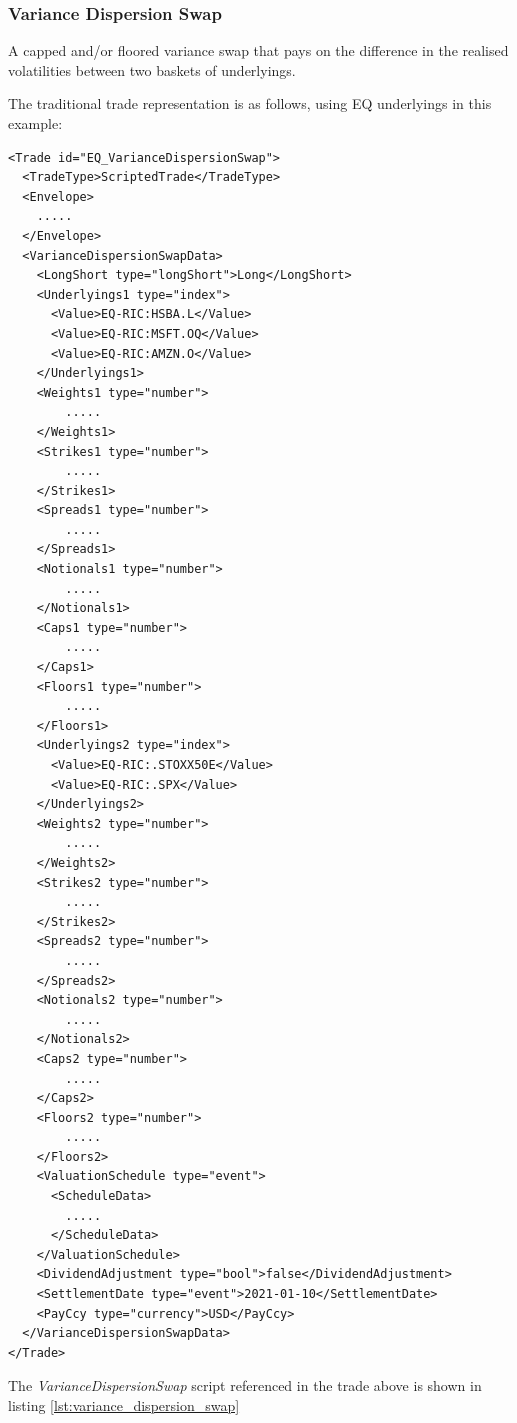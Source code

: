 \subsubsection{Variance Dispersion Swap}

A capped and/or floored variance swap that pays on the difference in the realised volatilities between two baskets of underlyings.

The traditional trade representation is as follows, using EQ underlyings in this example:

\begin{verbatim}
<Trade id="EQ_VarianceDispersionSwap">
  <TradeType>ScriptedTrade</TradeType>
  <Envelope>
    .....
  </Envelope>
  <VarianceDispersionSwapData>
    <LongShort type="longShort">Long</LongShort>
    <Underlyings1 type="index">
      <Value>EQ-RIC:HSBA.L</Value>
      <Value>EQ-RIC:MSFT.OQ</Value>
      <Value>EQ-RIC:AMZN.O</Value>
    </Underlyings1>
    <Weights1 type="number">
        .....
    </Weights1>
    <Strikes1 type="number">
        .....
    </Strikes1>
    <Spreads1 type="number">
        .....
    </Spreads1>
    <Notionals1 type="number">
        .....
    </Notionals1>
    <Caps1 type="number">
        .....
    </Caps1>
    <Floors1 type="number">
        .....
    </Floors1>
    <Underlyings2 type="index">
      <Value>EQ-RIC:.STOXX50E</Value>
      <Value>EQ-RIC:.SPX</Value>
    </Underlyings2>
    <Weights2 type="number">
        .....
    </Weights2>
    <Strikes2 type="number">
        .....
    </Strikes2>
    <Spreads2 type="number">
        .....
    </Spreads2>
    <Notionals2 type="number">
        .....
    </Notionals2>
    <Caps2 type="number">
        .....
    </Caps2>
    <Floors2 type="number">
        .....
    </Floors2>
    <ValuationSchedule type="event">
      <ScheduleData>
        .....
      </ScheduleData>
    </ValuationSchedule>
    <DividendAdjustment type="bool">false</DividendAdjustment>
    <SettlementDate type="event">2021-01-10</SettlementDate>
    <PayCcy type="currency">USD</PayCcy>
  </VarianceDispersionSwapData>
</Trade>
\end{verbatim}

The \emph{VarianceDispersionSwap} script referenced in the trade above is shown in listing
\ref{lst:variance_dispersion_swap}

